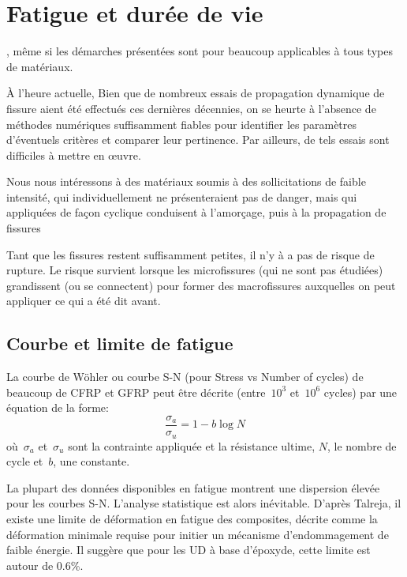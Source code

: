 \medskip
\section{Fatigue et durée de vie}

\medskip
{},
même si les démarches présentées sont pour beaucoup applicables à tous types
de matériaux.

\medskip
À l'heure actuelle, 
Bien que de nombreux essais de propagation dynamique de fissure aient été effectués
ces dernières décennies, on se heurte à l'absence de méthodes numériques suffisamment
fiables pour identifier les paramètres d'éventuels critères et comparer leur pertinence.
Par ailleurs, de tels essais sont difficiles à mettre en œuvre.

\medskip
Nous nous intéressons à des matériaux soumis à des sollicitations de faible intensité,
qui individuellement ne présenteraient pas de danger, mais qui appliquées de façon cyclique
conduisent à l'amorçage, puis à la propagation de fissures

Tant que les fissures restent suffisamment petites, il n'y à a pas de risque de rupture.
Le risque survient lorsque les microfissures (qui ne sont pas étudiées) grandissent (ou
se connectent) pour former des macrofissures auxquelles on peut appliquer ce qui a été dit avant.

\medskip
\subsection{Courbe et limite de fatigue}

La courbe de Wöhler
ou courbe S-N (pour Stress vs Number of cycles) de beaucoup de CFRP et
GFRP peut être décrite (entre~$10^3$ et~$10^6$ cycles) par une équation de la forme:
\begin{equation}  \dfrac{\sigma_a}{\sigma_u}=1-b\log N \end{equation}
où~$\sigma_a$ et~$\sigma_u$ sont la contrainte appliquée et la
résistance ultime, $N$, le nombre de cycle et~$b$, une constante.

\medskip
La plupart des données disponibles en fatigue montrent une dispersion
élevée pour les courbes S-N. L'analyse statistique est alors inévitable.
\medskipvm
D'après Talreja, il existe une limite de déformation en fatigue
des composites, décrite comme la déformation minimale requise pour
initier un mécanisme d'endommagement de faible énergie.
Il suggère que pour les UD à base d'époxyde, cette limite est
autour de 0.6\%.


